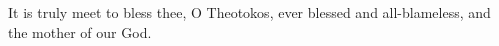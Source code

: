 It is truly meet to bless thee, O Theotokos, ever blessed and all-blameless, and the mother of our God. 

